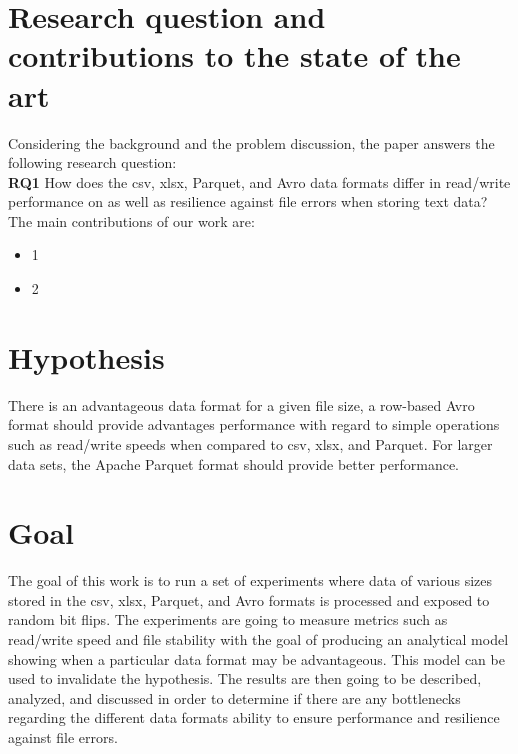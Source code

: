 \documentclass[12pt,twoside,english]{article}
\begin{document}
\begin{comment}
The purpose of this work is to present various metrics and criteria to help actors make the correct choice regarding data formats according to their needs. By analyzing the performance of data formats for data science under different conditions, one can use this work to tailor data science pipelines in order to minimize disk and network resources to optimize performance. The results are potentially of interest to research organizations, commercial actors, and the open-source community related to the field of data science.
\end{comment}

\section{Research question and contributions to the state of the art}
Considering the background and the problem discussion, the paper answers the following research question:\\

\textbf{RQ1} How does the csv, xlsx, Parquet, and Avro data formats differ in read/write performance on as well as resilience against file errors when storing text data?\\

The main contributions of our work are:

\begin{itemize}
    \item 1
    \item 2
\end{itemize}


\section{Hypothesis}
\label{sect:hypothesis}
There is an advantageous data format for a given file size, a row-based Avro format should provide advantages performance with regard to simple operations such as read/write speeds when compared to csv, xlsx, and Parquet. For larger data sets, the Apache Parquet format should provide better performance.


\section{Goal}
\label{sect:goals}
The goal of this work is to run a set of experiments where data of various sizes stored in the csv, xlsx, Parquet, and Avro formats is processed and exposed to random bit flips. The experiments are going to measure metrics such as read/write speed and file stability with the goal of producing an analytical model showing when a particular data format may be advantageous. This model can be used to invalidate the hypothesis. The results are then going to be described, analyzed, and discussed in order to determine if there are any bottlenecks regarding the different data formats ability to ensure performance and resilience against file errors. 
\end{document}
